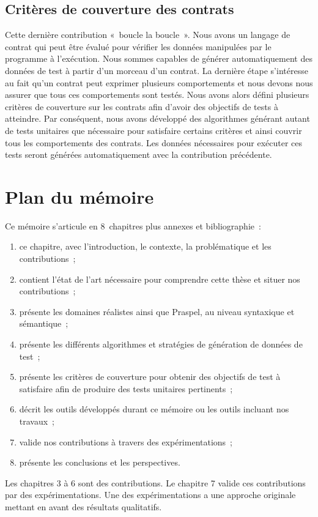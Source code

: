 \subsection{Critères de couverture des contrats}

Cette dernière contribution «~boucle la boucle~». Nous avons un langage de
contrat qui peut être évalué pour vérifier les données manipulées par le
programme à l'exécution. Nous sommes capables de générer automatiquement des
données de test à partir d'un morceau d'un contrat. La dernière étape
s'intéresse au fait qu'un contrat peut exprimer plusieurs comportements et nous
devons nous assurer que tous ces comportements sont testés. Nous avons alors
défini plusieurs critères de couverture sur les contrats afin d'avoir des
objectifs de tests à atteindre. Par conséquent, nous avons développé des
algorithmes générant autant de tests unitaires que nécessaire pour satisfaire
certains critères et ainsi couvrir tous les comportements des contrats. Les
données nécessaires pour exécuter ces tests seront générées automatiquement avec
la contribution précédente.

\section{Plan du mémoire}

Ce mémoire s'articule en 8~chapitres plus annexes et bibliographie~:
%
\begin{enumerate}

\item ce chapitre, avec l'introduction, le contexte, la problématique et les
contributions~;

\item contient l'état de l'art nécessaire pour comprendre cette thèse et situer
nos contributions~;

\item présente les domaines réalistes ainsi que Praspel, au niveau syntaxique et
sémantique~;

\item présente les différents algorithmes et stratégies de génération de données
de test~;

\item présente les critères de couverture pour obtenir des objectifs de test à
satisfaire afin de produire des tests unitaires pertinents~;

\item décrit les outils développés durant ce mémoire ou les outils incluant nos
travaux~;

\item valide nos contributions à travers des expérimentations~;

\item présente les conclusions et les perspectives.

\end{enumerate}
%
Les chapitres 3 à 6 sont des contributions. Le chapitre 7 valide ces
contributions par des expérimentations. Une des expérimentations a une approche
originale mettant en avant des résultats qualitatifs.
